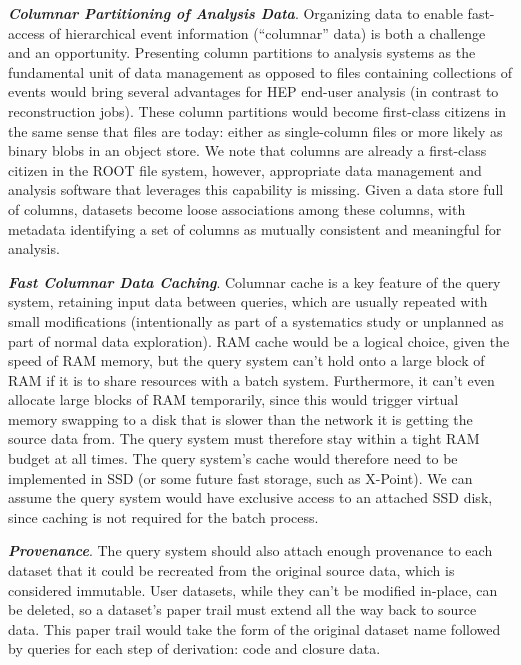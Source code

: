\documentclass[12pt,a4paper]{article}
\begin{document}
\vskip 0.1in\noindent
\textbf{\textit{Columnar Partitioning of Analysis Data}}.
Organizing data to enable fast-access of hierarchical event information (``columnar'' data) is both a challenge and an opportunity. Presenting column partitions to analysis systems as the fundamental unit of data management as opposed to files containing collections of events would bring several advantages for HEP end-user analysis (in contrast to reconstruction jobs). These column partitions would become first-class citizens in the same sense that files are today: either as single-column files or more likely as binary blobs in an object store. We note that columns are already a first-class citizen in the ROOT file system, however, appropriate data management and analysis software that leverages this capability is missing. Given a data store full of columns, datasets become loose associations among these columns, with metadata identifying a set of columns as mutually consistent and meaningful for analysis.

\vskip 0.1in\noindent
\textbf{\textit{Fast Columnar Data Caching}}.
Columnar cache is a key feature of the query system, retaining input data between queries, which are usually repeated with small modifications (intentionally as part of a systematics study or unplanned as part of normal data exploration). RAM cache would be a logical choice, given the speed of RAM memory, but the query system can't hold onto a large block of RAM if it is to share resources with a batch system. Furthermore, it can't even allocate large blocks of RAM temporarily, since this would trigger virtual memory swapping to a disk that is slower than the network it is getting the source data from. The query system must therefore stay within a tight RAM budget at all times. The query system's cache would therefore need to be implemented in SSD (or some future fast storage, such as X-Point). We can assume the query system would have exclusive access to an attached SSD disk, since caching is not required for the batch process.

\vskip 0.1in\noindent
\textbf{\textit{Provenance}}. The query system should also attach enough provenance to each dataset that it could be recreated from the original source data, which is considered immutable. User datasets, while they can't be modified in-place, can be deleted, so a dataset's paper trail must extend all the way back to source data. This paper trail would take the form of the original dataset name followed by queries for each step of derivation: code and closure data.
\end{document}
